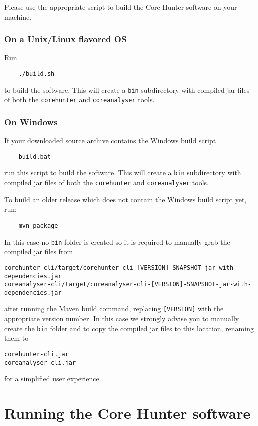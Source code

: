 \documentclass[a4paper, titlepage, 11pt]{article}
\begin{document}
Please use the appropriate script to build the Core Hunter software on your machine.

\subsubsection{On a Unix/Linux flavored OS}

Run
\begin{verbatim}
    ./build.sh
\end{verbatim}
to build the software. This will create a \texttt{bin} subdirectory with compiled jar files of both the \texttt{corehunter} and \texttt{coreanalyser} tools.

\subsubsection{On Windows}

If your downloaded source archive contains the Windows build script
\begin{verbatim}
    build.bat
\end{verbatim}
run this script to build the software. This will create a \texttt{bin} subdirectory with compiled jar files of both the \texttt{corehunter} and \texttt{coreanalyser} tools.

To build an older release which does not contain the Windows build script yet, run:
\begin{verbatim}
    mvn package
\end{verbatim}
In this case no \texttt{bin} folder is created so it is required to manually grab the compiled jar files from
\footnotesize
\begin{verbatim}
corehunter-cli/target/corehunter-cli-[VERSION]-SNAPSHOT-jar-with-dependencies.jar
coreanalyser-cli/target/coreanalyser-cli-[VERSION]-SNAPSHOT-jar-with-dependencies.jar
\end{verbatim}
\normalsize
after running the Maven build command, replacing \texttt{[VERSION]} with the appropriate version number. In this case we strongly advise you to manually create the \texttt{bin} folder and to copy the compiled jar files to this location, renaming them to
\begin{verbatim}
corehunter-cli.jar
coreanalyser-cli.jar
\end{verbatim}
for a simplified user experience.

\section{Running the Core Hunter software}
\end{document}
